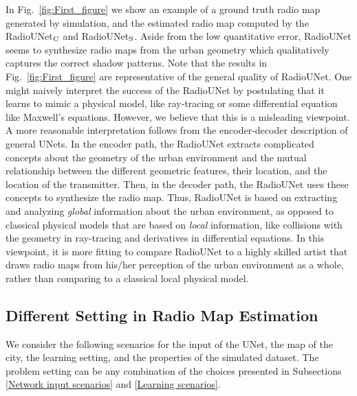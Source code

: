 \documentclass[10pt,a4paper]{article}
\begin{document}
In Fig.~\ref{fig:First_figure} we show an example of a ground truth radio map generated by simulation, and the estimated radio map computed by the RadioUNet$_{\rm C}$ and RadioUNet$_{\rm S}$. 
Aside from the low quantitative error, RadioUNet seems to synthesize radio maps from the urban geometry which qualitatively captures the correct shadow patterns. Note that the results in Fig.~\ref{fig:First_figure} are representative of the general quality of RadioUNet.
One might naively interpret the success of the RadioUNet by postulating that it learns to mimic a physical model, like ray-tracing or some differential equation like Maxwell's equations. However, we believe that this is a misleading viewpoint. A more reasonable interpretation follows from the encoder-decoder description of general UNets. In the encoder path, the RadioUNet extracts complicated concepts about the geometry of the urban environment and the mutual relationship between the different geometric features, their location, and the location of the transmitter. Then, in the decoder path, the RadioUNet uses these concepts to synthesize the radio map. Thus, RadioUNet is based on extracting and analyzing \emph{global} information about the urban environment, as opposed to classical physical models that are based on \emph{local} information, like collisions with the geometry in ray-tracing and derivatives in differential equations. In this viewpoint, it is more fitting to compare RadioUNet to a highly skilled artist that draws radio maps from his/her perception of the urban environment as a whole, rather than comparing to a classical local physical model.




\subsection{Different Setting in Radio Map Estimation}

We consider the following scenarios for the input of the UNet, the map of the city, the learning setting, and the properties of the simulated dataset. The problem setting can be any combination of the choices presented in Subsections \ref{Network input scenarios} and \ref{Learning scenarios}.
\end{document}
